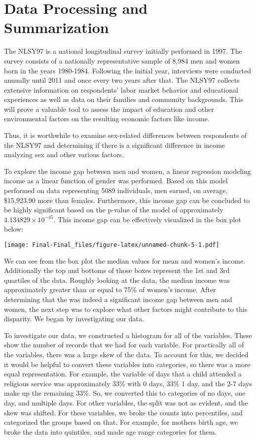 \documentclass[
]{article}
\author{}
\date{\vspace{-2.5em}}
\begin{document}
\hypertarget{data-processing-and-summarization}{%
\section{Data Processing and
Summarization}\label{data-processing-and-summarization}}

The NLSY97 is a national longitudinal survey initially performed in
1997. The survey consists of a nationally representative sample of 8,984
men and women born in the years 1980-1984. Following the initial year,
interviews were conducted annually until 2011 and once every two years
after that. The NLSY97 collects extensive information on respondents'
labor market behavior and educational experiences as well as data on
their families and community backgrounds. This will prove a valuable
tool to assess the impact of education and other environmental factors
on the resulting economic factors like income.

Thus, it is worthwhile to examine sex-related differences between
respondents of the NLSY97 and determining if there is a significant
difference in income analyzing sex and other various factors.

To explore the income gap between men and women, a linear regression
modeling income as a linear function of gender was performed. Based on
this model performed on data representing 5089 individuals, men earned,
on average, \$15,923.90 more than females. Furthermore, this income gap
can be concluded to be highly significant based on the p-value of the
model of approximately \ensuremath{4.134829\times 10^{-45}}. This income
gap can be effectively visualized in the box plot below:

\texttt{[image: Final-Final\_files/figure-latex/unnamed-chunk-5-1.pdf]}

We can see from the box plot the median values for mean and women's
income. Additionally the top and bottoms of those boxes represent the
1st and 3rd quartiles of the data. Roughly looking at the data, the
median income was approximately greater than or equal to 75\% of women's
income. After determining that the was indeed a significant income gap
between men and women, the next step was to explore what other factors
might contribute to this disparity. We began by investigating our data.

To investigate our data, we constructed a histogram for all of the
variables. These show the number of records that we had for each
variable. For practically all of the variables, there was a large skew
of the data. To account for this, we decided it would be helpful to
convert these variables into categories, so there was a more equal
representation. For example, the variable of days that a child attended
a religious service was approximately 33\% with 0 days, 33\% 1 day, and
the 2-7 days make up the remaining 33\%. So, we converted this to
categories of no days, one day, and multiple days. For other variables,
the split was not as evident, and the skew was shifted. For these
variables, we broke the counts into percentiles, and categorized the
groups based on that. For example, for mothers birth age, we broke the
data into quintiles, and made age range categories for them.
\end{document}
